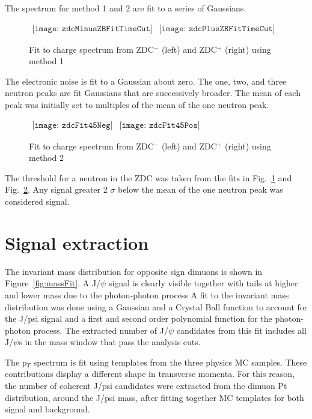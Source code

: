       The spectrum for method 1 and 2 are fit to a series of Gaussians.
      \begin{figure}[!Hh]
        \centering
        $ \begin{array}{cc}
          \texttt{[image: zdcMinusZBFitTimeCut]} &
          \texttt{[image: zdcPlusZBFitTimeCut]}
        \end{array} $
        \caption{Fit to charge spectrum from ZDC$^{-}$ (left) and ZDC$^{+}$ (right) using 
          method 1}
        \label{fig:zdcM1Fit}
      \end{figure}
      The electronic noise is fit to a Gaussian about zero.
      The one, two, and three neutron peaks are fit Gaussians that are 
        successively broader.
      The mean of each peak was initially set to multiples of the mean of the 
        one neutron peak. 
      \begin{figure}[!Hh]
        \centering
        $ \begin{array}{cc}
          \texttt{[image: zdcFit45Neg]} &
          \texttt{[image: zdcFit45Pos]}
        \end{array} $
        \caption{Fit to charge spectrum from ZDC$^{-}$ (left) and ZDC$^{+}$ (right) using 
          method 2}
        \label{fig:zdcM2Fit}
      \end{figure}
      The threshold for a neutron in the ZDC was taken from the fits in 
        Fig.~\ref{fig:zdcM1Fit} and Fig.~\ref{fig:zdcM2Fit}.
      Any signal greater 2 $\sigma$ below the mean of the one neutron peak was 
        considered signal. 

  \section{Signal extraction}
    The invariant mass distribution for opposite sign dimuons is shown in 
      Figure~\ref{fig:massFit}. 
    A J/$\psi$ signal is clearly visible together with tails at higher and lower mass
      due to the photon-photon process
    A fit to the invariant mass distribution was done using a Gaussian and a Crystal Ball
      function to account for the J/psi signal and a first and second order polynomial 
      function for the photon-photon process.
    The extracted number of J/$\psi$ candidates from this fit includes all J/$\psi$s in
      the mass window that pass the analysis cuts. 
    
    The p$_{T}$ spectrum is fit using templates from the three physics MC samples. 
    These contributions display a different shape in transverse momenta. 
    For this reason, the number of coherent J/psi candidates were extracted 
      from the dimuon Pt distribution, around the J/psi mass, after fitting 
      together MC templates for both signal and background.

